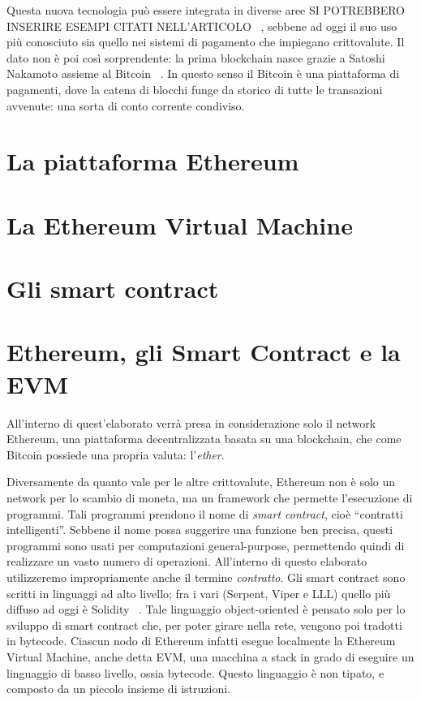 \newline
Questa nuova tecnologia può essere integrata in diverse aree SI POTREBBERO INSERIRE ESEMPI CITATI NELL'ARTICOLO ~\cite{iansiti_lakhani_2017}, sebbene ad oggi il suo uso più conosciuto sia quello nei sistemi di pagamento che impiegano crittovalute.
Il dato non è poi così sorprendente: la prima blockchain nasce grazie a Satoshi Nakamoto assieme al Bitcoin ~\cite{nakamoto2008bitcoin}. In questo senso il Bitcoin è una piattaforma di pagamenti, dove la catena di blocchi funge da storico di tutte le transazioni avvenute: una sorta di conto corrente condiviso.\newline


\section{La piattaforma Ethereum}

\section{La Ethereum Virtual Machine}

\section{Gli smart contract}

\section{Ethereum, gli Smart Contract e la EVM}

All'interno di quest'elaborato verrà presa in considerazione solo il network Ethereum, una piattaforma decentralizzata basata su una blockchain, che come Bitcoin possiede una propria valuta: l'\textit{ether}.\newline

Diversamente da quanto vale per le altre crittovalute, Ethereum non è solo un network per lo scambio di moneta, ma un framework che permette l'esecuzione di programmi. Tali programmi prendono il nome di \textit{smart contract}, cioè ``contratti intelligenti''. Sebbene il nome possa suggerire una funzione ben precisa, questi programmi sono usati per computazioni general-purpose, permettendo quindi di realizzare un vasto numero di operazioni. All'interno di questo elaborato utilizzeremo impropriamente anche il termine \textit{contratto}.\newline
Gli smart contract sono scritti in linguaggi ad alto livello; fra i vari (Serpent, Viper e LLL) quello più diffuso ad oggi è Solidity ~\cite{ethereum/solidity_2019}. 
Tale linguaggio object-oriented è pensato solo per lo sviluppo di smart contract che, per poter girare nella rete, vengono poi tradotti in bytecode. Ciascun nodo di Ethereum infatti esegue localmente la Ethereum Virtual Machine, anche detta EVM, una macchina a stack in grado di eseguire un linguaggio di basso livello, ossia bytecode. Questo linguaggio è non tipato, e composto da un piccolo insieme di istruzioni.\newline 


